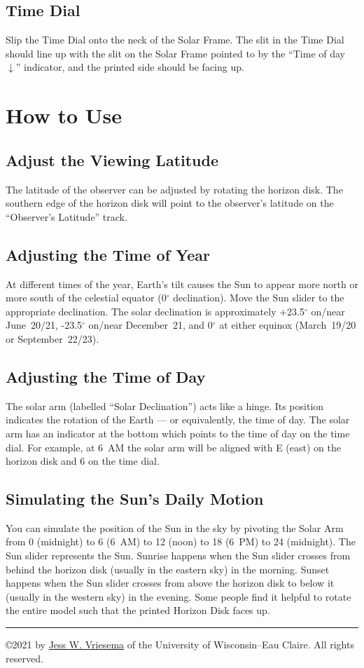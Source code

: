 \documentclass[tikz]{article}
\begin{document}
\begin{multicols}{2}
	\subsection{Time Dial}
	Slip the Time Dial onto the neck of the Solar Frame. The slit in the Time Dial should line up with the slit on the Solar Frame pointed to by the ``Time of day $\downarrow$'' indicator, and the printed side should be facing up. 
	
	
	\section{How to Use}
	\subsection{Adjust the Viewing Latitude}
	The latitude of the observer can be adjusted by rotating the horizon disk. The southern edge of the horizon disk will point to the observer's latitude on the ``Observer's Latitude'' track. 
	
	\subsection{Adjusting the Time of Year}
	At different times of the year, Earth's tilt causes the Sun to appear more north or more south of the celestial equator (0$^\circ$ declination). Move the Sun slider to the appropriate declination. The solar declination is approximately +23.5$^\circ$ on/near June~20/21, -23.5$^\circ$ on/near December~21, and 0$^\circ$ at either equinox (March~19/20 or September~22/23). 
	
	\subsection{Adjusting the Time of Day}
	The solar arm (labelled ``Solar Declination'') acts like a hinge. Its position indicates the rotation of the Earth --- or equivalently, the time of day. The solar arm has an indicator at the bottom which points to the time of day on the time dial. For example, at 6~AM the solar arm will be aligned with E (east) on the horizon disk and 6 on the time dial. 
	
	\subsection{Simulating the Sun's Daily Motion}
	You can simulate the position of the Sun in the sky by pivoting the Solar Arm from 0 (midnight) to 6 (6~AM) to 12 (noon) to 18 (6~PM) to 24 (midnight). The Sun slider represents the Sun. Sunrise happens when the Sun slider crosses from behind the horizon disk (usually in the eastern sky) in the morning. Sunset happens when the Sun slider crosses from above the horizon disk to below it (usually in the western sky) in the evening. Some people find it helpful to rotate the entire model such that the printed Horizon Disk faces up.
\vfill
\hrule 
\noindent\copyright 2021 by \href{https://www.lpl.arizona.edu/~vriesema/}{Jess W. Vriesema} of the University of Wisconsin--Eau Claire. All rights reserved. 
	\end{multicols}
\end{document}
